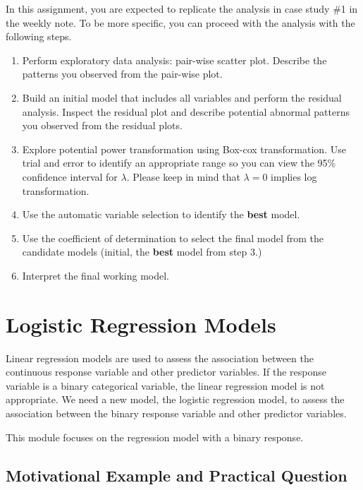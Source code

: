 \documentclass[
]{book}
\begin{document}
\hfill\break

In this assignment, you are expected to replicate the analysis in case study \#1 in the weekly note. To be more specific, you can proceed with the analysis with the following steps.

\begin{enumerate}
\def\labelenumi{\arabic{enumi}.}
\item
  Perform exploratory data analysis: pair-wise scatter plot. Describe the patterns you observed from the pair-wise plot.
\item
  Build an initial model that includes all variables and perform the residual analysis. Inspect the residual plot and describe potential abnormal patterns you observed from the residual plots.
\item
  Explore potential power transformation using Box-cox transformation. Use trial and error to identify an appropriate range so you can view the 95\% confidence interval for \(\lambda\). Please keep in mind that \(\lambda = 0\) implies log transformation.
\item
  Use the automatic variable selection to identify the \textbf{best} model.
\item
  Use the coefficient of determination to select the final model from the candidate models (initial, the \textbf{best} model from step 3.)
\item
  Interpret the final working model.
\end{enumerate}

\hypertarget{logistic-regression-models}{%
\chapter{Logistic Regression Models}\label{logistic-regression-models}}

Linear regression models are used to assess the association between the continuous response variable and other predictor variables. If the response variable is a binary categorical variable, the linear regression model is not appropriate. We need a new model, the logistic regression model, to assess the association between the binary response variable and other predictor variables.

This module focuses on the regression model with a binary response.

\hypertarget{motivational-example-and-practical-question}{%
\section{Motivational Example and Practical Question}\label{motivational-example-and-practical-question}}
\end{document}
